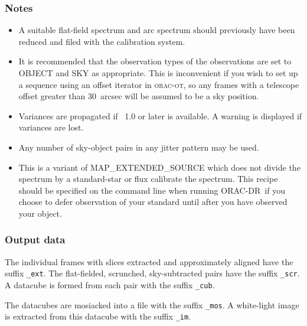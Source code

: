 \documentclass[twoside,11pt,nolof]{starlink}
\providecommand{\KAPPA}{\xref{{\sc{Kappa}}}{sun95}{}}
\providecommand{\ORACDR}{{\footnotesize ORAC-DR}}
\begin{document}
\subsubsection*{Notes}\begin{itemize}
\item

  A suitable flat-field spectrum and arc spectrum should previously
  have been reduced and filed with the calibration system.

\item

It is recommended that the observation types of the observations are set
to OBJECT and SKY as appropriate. This is inconvenient if you wish to
set up a sequence using an offset iterator in \textsc{orac-ot}, so any frames
with a telescope offset greater than 30~arcsec will be assumed to be a
sky position.

\item

Variances are propagated if \KAPPA\ 1.0 or later is available. A warning
is displayed if variances are lost.

\item

Any number of sky-object pairs in any jitter pattern may be used.

\item
    This is a variant of MAP\_EXTENDED\_SOURCE which does not divide the
  spectrum by a standard-star or flux calibrate the spectrum. This
  recipe should be specified on the command line when running
  \ORACDR\ if you choose to defer observation of your standard until
  after you have observed your object.


\end{itemize}

\subsubsection*{Output data}

The individual frames with slices extracted and approximately aligned
have the suffix \texttt{\_ext}. The flat-fielded, scrunched,
sky-subtracted pairs have the suffix \texttt{\_scr}. A datacube is
formed from each pair with the suffix \texttt{\_cub}.

The datacubes are mosiacked into a file with the suffix \texttt{\_mos}. A
white-light image is extracted from this datacube with the suffix \texttt{\_im}.

\clearpage
\end{document}
